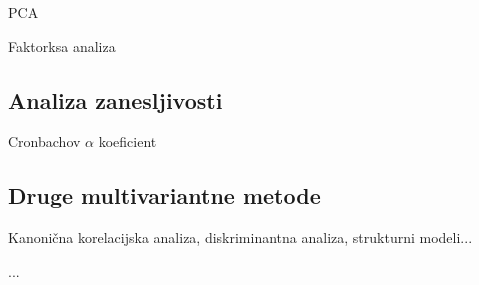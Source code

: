 PCA

Faktorksa analiza

\subsection*{Analiza zanesljivosti}

Cronbachov $\alpha$ koeficient

\subsection*{Druge multivariantne metode}

Kanonična korelacijska analiza, diskriminantna analiza, strukturni modeli...




\begin{Vaje}{1}
    ...
\end{Vaje}